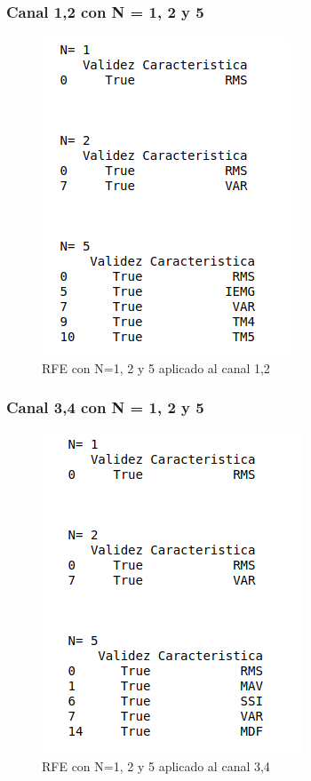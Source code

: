         \subsubsection{Canal 1,2 con N = 1, 2 y 5}
        \begin{figure}[ht]
            \centering
            \includegraphics[scale=0.3]{imagenes/RFE canal 12.png}
            \caption{RFE con N=1, 2 y 5 aplicado al canal 1,2 }
            \label{fig:REF canal 12}
        \end{figure}
        
        \subsubsection{Canal 3,4 con N = 1, 2 y 5}
        \begin{figure}[ht]
            \centering
            \includegraphics[scale=0.3]{imagenes/RFE canal 34.png}
            \caption{RFE con N=1, 2 y 5 aplicado al canal 3,4 }
            \label{fig:REF canal 34}
        \end{figure}
        
